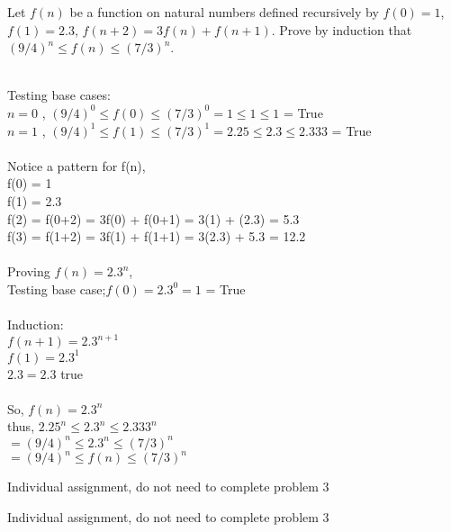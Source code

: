 \documentclass[11pt]{article}
\begin{document}

\pagebreak

\begin{problem}
	Let $f(n)$ be a function on natural numbers defined
recursively by $f(0) = 1$, $f(1) = 2.3$, $f(n+2) = 3f(n) + f(n+1)$.
Prove by induction that
$(9/4)^n \le f(n) \le (7/3)^n$.
\end{problem}


\begin{solution}
	\\Testing base cases:
	\\$n = 0$ , $(9/4)^0\leq f(0) \leq (7/3)^0 = 1 \leq 1 \leq 1$ = True
	\\$n = 1$ , $(9/4)^1 \leq f(1) \leq (7/3)^1 = 2.25 \leq 2.3 \leq 2.333$ = True
	\\
	\\Notice a pattern for f(n),
	\\f(0) = 1
	\\f(1) = 2.3
	\\f(2) = f(0+2) = 3f(0) + f(0+1) = 3(1) + (2.3) = 5.3
	\\f(3) = f(1+2) = 3f(1) + f(1+1) = 3(2.3) + 5.3 = 12.2
	\\
	\\Proving $f(n) = 2.3^n$,
	\\Testing base case;$f(0) = 2.3^0 = 1$ = True\\
	\\Induction:\\$f(n+1) = 2.3^{n+1}$
	\\           $f(1)  = 2.3^1$
	\\           $2.3   = 2.3$ true \\
	\\ So, $f(n)=2.3^n$
	\\ thus, $2.25^n \leq 2.3^n \leq 2.333^n$
	\\ $=(9/4)^n \leq 2.3^n \leq (7/3)^n$
	\\ $=(9/4)^n \le f(n) \le (7/3)^n$
\end{solution}


\begin{problem}
 	Individual assignment, do not need to complete problem 3
\end{problem}


\begin{solution}
	Individual assignment, do not need to complete problem 3
\end{solution}
\end{document}

